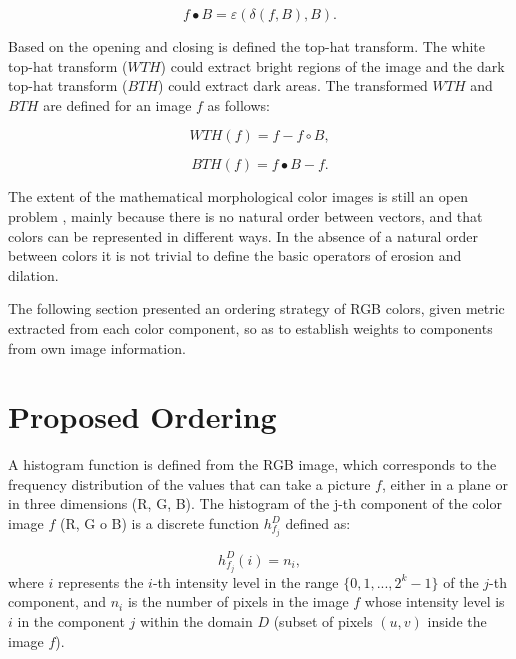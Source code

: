 \begin{equation}
f\bullet B = \varepsilon(\delta(f,B),B).
\end{equation}

Based on the opening and closing is defined the top-hat transform. The white top-hat transform ($WTH$) could extract bright regions of the image and the dark top-hat transform ($BTH$) could extract dark areas. The transformed $WTH$ and $BTH$ are defined for an image $f$ as follows:

\begin{equation}
WTH(f) = f - f\circ B,
\end{equation}

\begin{equation}
BTH(f) = f\bullet B - f. 
\end{equation}

The extent of the mathematical morphological color images is still an open problem \cite{aptoula2007pseudo}, mainly because there is no natural order between vectors, and that colors can be represented in different ways. In the absence of a natural order between colors it is not trivial to define the basic operators of erosion and dilation.  

The following section presented  an ordering strategy of RGB colors, given metric extracted from each color component, so as to establish weights to components from own image information.

\section{Proposed Ordering}
A histogram function is defined from the RGB image, which corresponds to the frequency distribution of the values that can take a picture $f$, either in a plane or in three dimensions (R, G, B). The histogram of the j-th component of the color image $f$ (R, G o B) is a discrete function $h_{f_j}^{D}$ defined as:%

\begin{equation}
\label{histograma}
   h_{f_j}^{D}(i) = n_i,
\end{equation} 
where ${i}$ represents the $i$-th intensity level in the range $\{0,1,...,2^k-1\}$ 
of the $j$-th component, and $n_i$ is the number of pixels in the image $f$ whose intensity level is $i$ in the component $j$ 
within the domain $D$ (subset of pixels $(u,v)$ inside the image $f$).

